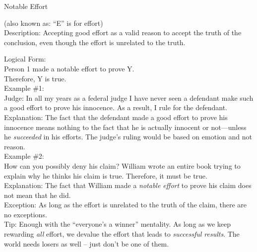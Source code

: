 \documentclass[a4paper,12pt,single,pdftex]{scrartcl}
\begin{document}
  

Notable Effort
    
      (also known as: “E” is for effort)
    \\

  
    Description: Accepting good effort as a valid reason to accept the truth of the conclusion, even though the effort is unrelated to the truth.

    
      Logical Form:
    \\

    
      Person 1 made a notable effort to prove Y.
    \\

    
      Therefore, Y is true.
    \\

    
      Example \#1:
    \\

    
      Judge: In all my years as a federal judge I have never seen a defendant make such a good effort to prove his innocence.  As a result, I rule for the defendant.
    \\

    
      Explanation: The fact that the defendant made a good effort to prove his innocence means nothing to the fact that he is actually innocent or not—unless he {\it succeeded }in his efforts.  The judge's ruling would be based on emotion and not reason.
    \\

    
      Example \#2:
    \\

    
      How can you possibly deny his claim?  William wrote an entire book trying to explain why he thinks his claim is true.  Therefore, it must be true.
    \\

    
      Explanation: The fact that William made a {\it notable effort}  to prove his claim does not mean that he did.
    \\

    
      Exception: As long as the effort is unrelated to the truth of the claim, there are no exceptions.
    \\

    
      Tip: Enough with the “everyone’s a winner” mentality.  As long as we keep rewarding {\it all} effort, we devalue the effort that leads to {\it successful results}.  The world needs losers as well -- just don’t be one of them.
    \\
\end{document}
